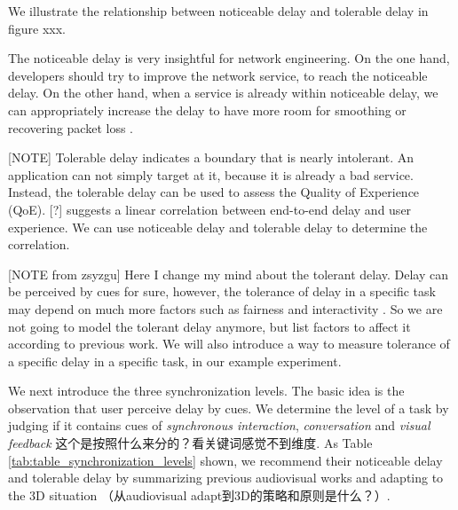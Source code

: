 We illustrate the relationship between noticeable delay and tolerable delay in figure xxx.

The noticeable delay is very insightful for network engineering. On the one hand, developers should try to improve the network service, to reach the noticeable delay. On the other hand, when a service is already within noticeable delay, we can appropriately increase the delay to have more room for smoothing or recovering packet loss \cite{xu2013exploiting}.

[NOTE] Tolerable delay indicates a boundary that is nearly intolerant. An application can not simply target at it, because it is already a bad service. Instead, the tolerable delay can be used to assess the Quality of Experience (QoE). [?] suggests a linear correlation between end-to-end delay and user experience. We can use noticeable delay and tolerable delay to determine the correlation.

[NOTE from zsyzgu] Here I change my mind about the tolerant delay. Delay can be perceived by cues for sure, however, the tolerance of delay in a specific task may depend on much more factors such as fairness and interactivity \cite{ishibashi2006subjective, montagud2012inter}. So we are not going to model the tolerant delay anymore, but list factors to affect it according to previous work. We will also introduce a way to measure tolerance of a specific delay in a specific task, in our example experiment.

We next introduce the three synchronization levels. The basic idea is the observation that user perceive delay by cues. We determine the level of a task by judging if it contains cues of \emph{synchronous interaction}, \emph{conversation} and \emph{visual feedback} 这个是按照什么来分的？看关键词感觉不到维度. As Table \ref{tab:table_synchronization_levels} shown, we recommend their noticeable delay and tolerable delay by summarizing previous audiovisual works and adapting to the 3D situation （从audiovisual adapt到3D的策略和原则是什么？）.

